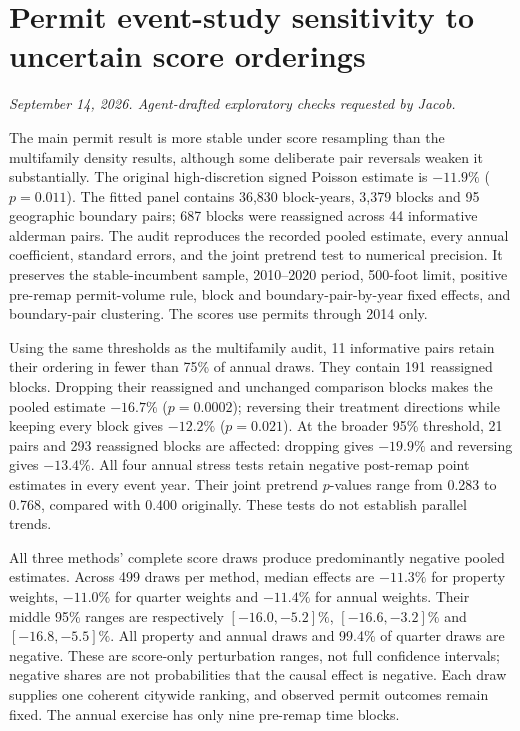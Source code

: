 \clearpage
\section*{Permit event-study sensitivity to uncertain score orderings}
\textit{September 14, 2026. Agent-drafted exploratory checks requested by Jacob.}

The main permit result is more stable under score resampling than the
multifamily density results, although some deliberate pair reversals weaken
it substantially. The original high-discretion signed Poisson estimate is
$-11.9\%$ ($p=0.011$). The fitted panel contains 36,830 block-years, 3,379
blocks and 95 geographic boundary pairs; 687 blocks were reassigned across
44 informative alderman pairs. The audit reproduces the recorded pooled
estimate, every annual coefficient, standard errors, and the joint pretrend
test to numerical precision. It preserves the stable-incumbent sample,
2010--2020 period, 500-foot limit, positive pre-remap permit-volume rule,
block and boundary-pair-by-year fixed effects, and boundary-pair clustering.
The scores use permits through 2014 only.

Using the same thresholds as the multifamily audit, 11 informative pairs
retain their ordering in fewer than 75\% of annual draws. They contain 191
reassigned blocks. Dropping their reassigned and unchanged comparison blocks
makes the pooled estimate $-16.7\%$ ($p=0.0002$); reversing their treatment
directions while keeping every block gives $-12.2\%$ ($p=0.021$). At the
broader 95\% threshold, 21 pairs and 293 reassigned blocks are affected:
dropping gives $-19.9\%$ and reversing gives $-13.4\%$. All four annual
stress tests retain negative post-remap point estimates in every event year.
Their joint pretrend $p$-values range from 0.283 to 0.768, compared with
0.400 originally. These tests do not establish parallel trends.

All three methods' complete score draws produce predominantly negative
pooled estimates. Across 499 draws per method, median effects are $-11.3\%$
for property weights, $-11.0\%$ for quarter weights and $-11.4\%$ for annual
weights. Their middle 95\% ranges are respectively $[-16.0,-5.2]\%$,
$[-16.6,-3.2]\%$ and $[-16.8,-5.5]\%$. All property and annual draws and
99.4\% of quarter draws are negative. These are score-only perturbation
ranges, not full confidence intervals; negative shares are not probabilities
that the causal effect is negative. Each draw supplies one coherent citywide
ranking, and observed permit outcomes remain fixed. The annual exercise has
only nine pre-remap time blocks.

